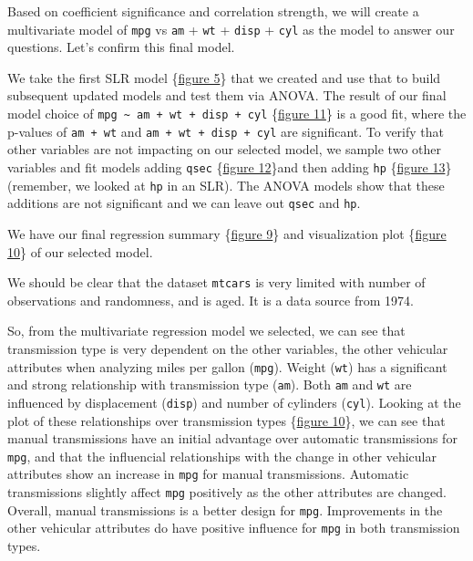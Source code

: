 \documentclass[10pt,]{article}
\begin{document}
Based on coefficient significance and correlation strength, we will
create a multivariate model of \texttt{mpg} vs \texttt{am} + \texttt{wt}
+ \texttt{disp} + \texttt{cyl} as the model to answer our questions.
Let's confirm this final model.

We take the first SLR model \{\hyperref[fig5]{figure 5}\} that we
created and use that to build subsequent updated models and test them
via ANOVA. The result of our final model choice of
\texttt{mpg\ \textasciitilde{}\ am\ +\ wt\ +\ disp\ +\ cyl}
\{\hyperref[anova1]{figure 11}\} is a good fit, where the p-values of
\texttt{am\ +\ wt} and \texttt{am\ +\ wt\ +\ disp\ +\ cyl} are
significant. To verify that other variables are not impacting on our
selected model, we sample two other variables and fit models adding
\texttt{qsec} \{\hyperref[anova2]{figure 12}\}and then adding
\texttt{hp} \{\hyperref[anova3]{figure 13}\} (remember, we looked at
\texttt{hp} in an SLR). The ANOVA models show that these additions are
not significant and we can leave out \texttt{qsec} and \texttt{hp}.

We have our final regression summary \{\hyperref[fig9]{figure 9}\} and
visualization plot \{\hyperref[fig10]{figure 10}\} of our selected
model.


We should be clear that the dataset \texttt{mtcars} is very limited with
number of observations and randomness, and is aged. It is a data source
from 1974.

So, from the multivariate regression model we selected, we can see that
transmission type is very dependent on the other variables, the other
vehicular attributes when analyzing miles per gallon (\texttt{mpg}).
Weight (\texttt{wt}) has a significant and strong relationship with
transmission type (\texttt{am}). Both \texttt{am} and \texttt{wt} are
influenced by displacement (\texttt{disp}) and number of cylinders
(\texttt{cyl}). Looking at the plot of these relationships over
transmission types \{\hyperref[fig10]{figure 10}\}, we can see that
manual transmissions have an initial advantage over automatic
transmissions for \texttt{mpg}, and that the influencial relationships
with the change in other vehicular attributes show an increase in
\texttt{mpg} for manual transmissions. Automatic transmissions slightly
affect \texttt{mpg} positively as the other attributes are changed.
Overall, manual transmissions is a better design for \texttt{mpg}.
Improvements in the other vehicular attributes do have positive
influence for \texttt{mpg} in both transmission types.
\end{document}

